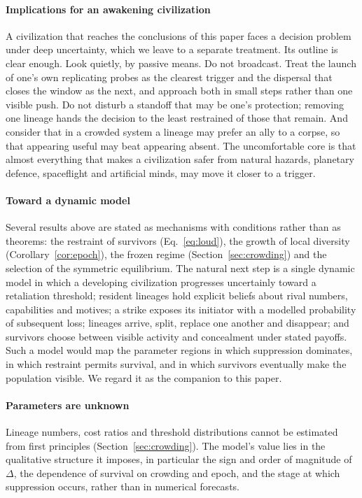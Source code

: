 \documentclass[preprint,12pt]{elsarticle}
\theoremstyle{definition}
\begin{document}
\paragraph{Implications for an awakening civilization}
A civilization that reaches the conclusions of this paper faces a decision problem under deep uncertainty, which we leave to a separate treatment. Its outline is clear enough. Look quietly, by passive means. Do not broadcast. Treat the launch of one's own replicating probes as the clearest trigger and the dispersal that closes the window as the next, and approach both in small steps rather than one visible push. Do not disturb a standoff that may be one's protection; removing one lineage hands the decision to the least restrained of those that remain. And consider that in a crowded system a lineage may prefer an ally to a corpse, so that appearing useful may beat appearing absent. The uncomfortable core is that almost everything that makes a civilization safer from natural hazards, planetary defence, spaceflight and artificial minds, may move it closer to a trigger.

\paragraph{Toward a dynamic model}
Several results above are stated as mechanisms with conditions rather than as theorems: the restraint of survivors (Eq.~\ref{eq:loud}), the growth of local diversity (Corollary~\ref{cor:epoch}), the frozen regime (Section~\ref{sec:crowding}) and the selection of the symmetric equilibrium. The natural next step is a single dynamic model in which a developing civilization progresses uncertainly toward a retaliation threshold; resident lineages hold explicit beliefs about rival numbers, capabilities and motives; a strike exposes its initiator with a modelled probability of subsequent loss; lineages arrive, split, replace one another and disappear; and survivors choose between visible activity and concealment under stated payoffs. Such a model would map the parameter regions in which suppression dominates, in which restraint permits survival, and in which survivors eventually make the population visible. We regard it as the companion to this paper.

\paragraph{Parameters are unknown}
Lineage numbers, cost ratios and threshold distributions cannot be estimated from first principles (Section~\ref{sec:crowding}). The model's value lies in the qualitative structure it imposes, in particular the sign and order of magnitude of $\Delta$, the dependence of survival on crowding and epoch, and the stage at which suppression occurs, rather than in numerical forecasts.
\end{document}
